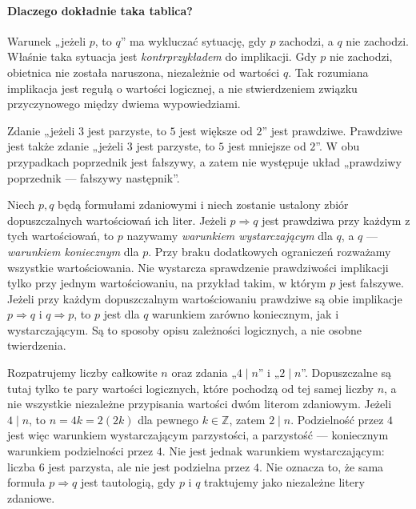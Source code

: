 \paragraph{Dlaczego dokładnie taka tablica?}
Warunek „jeżeli $p$, to $q$” ma wykluczać sytuację, gdy $p$
zachodzi, a $q$ nie zachodzi. Właśnie taka sytuacja jest
\emph{kontrprzykładem} do implikacji. Gdy $p$ nie zachodzi,
obietnica nie została naruszona, niezależnie od wartości $q$.
Tak rozumiana implikacja jest regułą o wartości logicznej, a nie
stwierdzeniem związku przyczynowego między dwiema wypowiedziami.

\begin{przyklad}
Zdanie „jeżeli $3$ jest parzyste, to $5$ jest większe od $2$”
jest prawdziwe. Prawdziwe jest także zdanie „jeżeli $3$ jest
parzyste, to $5$ jest mniejsze od $2$”. W obu przypadkach
poprzednik jest fałszywy, a zatem nie występuje układ
„prawdziwy poprzednik --- fałszywy następnik”.
\end{przyklad}

\begin{definicja}
Niech $p,q$ będą formułami zdaniowymi i niech zostanie ustalony
zbiór dopuszczalnych wartościowań ich liter. Jeżeli
$p\Rightarrow q$ jest prawdziwa przy każdym z tych wartościowań,
to $p$ nazywamy \emph{warunkiem wystarczającym} dla $q$,
a $q$ --- \emph{warunkiem koniecznym} dla $p$.
Przy braku dodatkowych ograniczeń rozważamy wszystkie
wartościowania. Nie wystarcza sprawdzenie prawdziwości
implikacji tylko przy jednym wartościowaniu, na przykład takim,
w którym $p$ jest fałszywe. Jeżeli przy każdym dopuszczalnym
wartościowaniu prawdziwe są obie implikacje $p\Rightarrow q$
i $q\Rightarrow p$, to $p$ jest dla $q$ warunkiem zarówno
koniecznym, jak i wystarczającym. Są to sposoby opisu
zależności logicznych, a nie osobne twierdzenia.
\end{definicja}

\begin{przyklad}
Rozpatrujemy liczby całkowite $n$ oraz zdania „$4\mid n$” i „$2\mid n$”.
Dopuszczalne są tutaj tylko te pary wartości logicznych, które
pochodzą od tej samej liczby $n$, a nie wszystkie niezależne
przypisania wartości dwóm literom zdaniowym. Jeżeli $4\mid n$,
to $n=4k=2(2k)$ dla pewnego $k\in\mathbb Z$, zatem $2\mid n$.
Podzielność przez $4$ jest więc warunkiem wystarczającym
parzystości, a parzystość --- koniecznym warunkiem podzielności
przez $4$. Nie jest jednak warunkiem wystarczającym: liczba $6$
jest parzysta, ale nie jest podzielna przez $4$. Nie oznacza to,
że sama formuła $p\Rightarrow q$ jest tautologią, gdy $p$ i $q$
traktujemy jako niezależne litery zdaniowe.
\end{przyklad}

